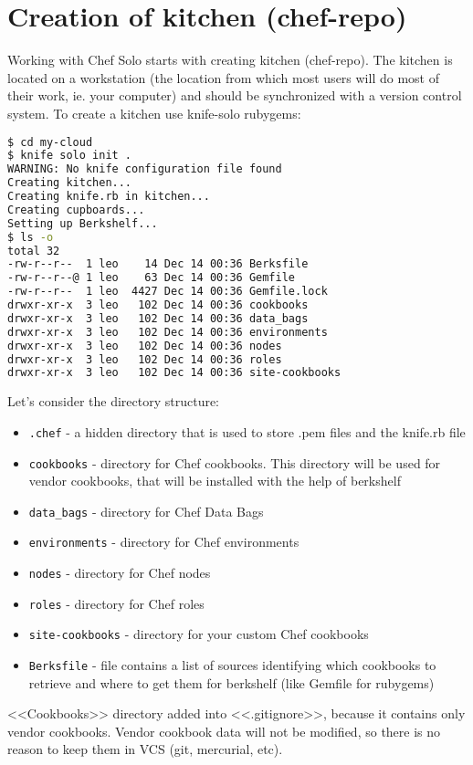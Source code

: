 \section{Creation of kitchen (chef-repo)}
\label{sec:solo-kitchen}

Working with Chef Solo starts with creating kitchen (chef-repo). The kitchen is located on a workstation (the location from which most users will do most of their work, ie. your computer) and should be synchronized with a version control system. To create a kitchen use knife-solo rubygems:

\begin{lstlisting}[language=Bash,label=lst:my-cloud-kitchen1,title=my-cloud]
$ cd my-cloud
$ knife solo init .
WARNING: No knife configuration file found
Creating kitchen...
Creating knife.rb in kitchen...
Creating cupboards...
Setting up Berkshelf...
$ ls -o
total 32
-rw-r--r--  1 leo    14 Dec 14 00:36 Berksfile
-rw-r--r--@ 1 leo    63 Dec 14 00:36 Gemfile
-rw-r--r--  1 leo  4427 Dec 14 00:36 Gemfile.lock
drwxr-xr-x  3 leo   102 Dec 14 00:36 cookbooks
drwxr-xr-x  3 leo   102 Dec 14 00:36 data_bags
drwxr-xr-x  3 leo   102 Dec 14 00:36 environments
drwxr-xr-x  3 leo   102 Dec 14 00:36 nodes
drwxr-xr-x  3 leo   102 Dec 14 00:36 roles
drwxr-xr-x  3 leo   102 Dec 14 00:36 site-cookbooks
\end{lstlisting}

Let's consider the directory structure:

\begin{itemize}
  \item \lstinline!.chef! - a hidden directory that is used to store .pem files and the knife.rb file
  \item \lstinline!cookbooks! - directory for Chef cookbooks. This directory will be used for vendor cookbooks, that will be installed with the help of berkshelf
  \item \lstinline!data_bags! - directory for Chef Data Bags
  \item \lstinline!environments! - directory for Chef environments
  \item \lstinline!nodes! - directory for Chef nodes
  \item \lstinline!roles! - directory for Chef roles
  \item \lstinline!site-cookbooks! - directory for your custom Chef cookbooks
  \item \lstinline!Berksfile! - file contains a list of sources identifying which cookbooks to retrieve and where to get them for berkshelf (like Gemfile for rubygems)
\end{itemize}

<<Cookbooks>> directory added into <<.gitignore>>, because it contains only vendor cookbooks. Vendor cookbook data will not be modified, so there is no reason to keep them in VCS (git, mercurial, etc).
